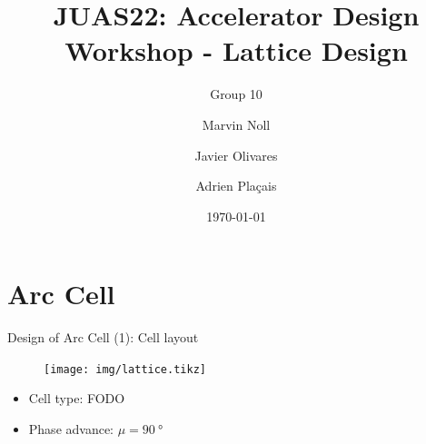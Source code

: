 \documentclass{beamer}
\title[Topic III: Lattice Design]{JUAS22: Accelerator Design Workshop - Lattice Design}
\subtitle{Group 10}
\author[Noll, Olivares, Plaçais]{Marvin Noll \and Javier Olivares \and Adrien Plaçais}
\date[\today]{\today}
\begin{document}
\begin{frame}[plain]
  \titlepage
\end{frame}

\section{Arc Cell}
\begin{frame}[t,fragile]{Design of Arc Cell (1): Cell layout}
\begin{figure}
\centering
\texttt{[image: img/lattice.tikz]}
\end{figure}
\begin{itemize}
\item Cell type: FODO
\item Phase advance: $\mu=\SI{90}{\degree}$
\end{itemize}
\end{frame}
\end{document}
